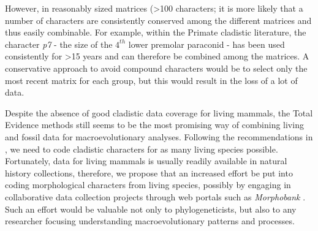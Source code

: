 However, in reasonably sized matrices (\textgreater 100 characters; \citep{GuillermeCooper,harrisonamong-character2014} it is more likely that a number of characters are consistently conserved among the different matrices and thus easily combinable.
For example, within the Primate cladistic literature, the character \textit{p7} - the size of the $4^{th}$ lower premolar paraconid - has been used consistently for \textgreater 15 years \citep[e.g.][]{ross1998phylogenetic,marivaux2005anthropoi,ni2013oldest} and can therefore be combined among the matrices.
A conservative approach to avoid compound characters would be to select only the most recent matrix for each group, but this would result in the loss of a lot of data.

Despite the absence of good cladistic data coverage for living mammals, the Total Evidence methods still seems to be the most promising way of combining living and fossil data for macroevolutionary analyses. 
Following the recommendations in \citep{GuillermeCooper}, we need to code cladistic characters for as many living species possible. 
Fortunately, data for living mammals is usually readily available in natural history collections, therefore, we propose that an increased effort be put into coding morphological characters from living species, possibly by engaging in collaborative data collection projects through web portals such as \textit{Morphobank} \citep{morphobank}.
Such an effort would be valuable not only to phylogeneticists, but also to any researcher focusing understanding macroevolutionary patterns and processes.%


% 
% 

%


%
